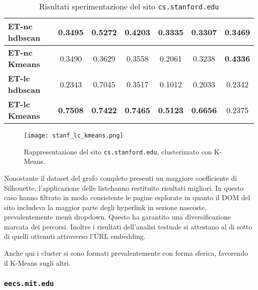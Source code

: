 \begin{table}[H]
\begin{tabular}{| l | c | c | c | c | c | c |}
	\textbf{ET-nc hdbscan} & 0.3495 & 0.5272 & 0.4203 & 0.3335 & 0.3307 & 0.3469\\ [2ex]
	 \hline
	\textbf{ET-nc Kmeans} & 0.3490 & 0.3629 & 0.3558 & 0.2061 & 0.3238 & \textbf{0.4336}\\ [2ex]
	 \hline	
	\textbf{ET-lc hdbscan} & 0.2343 & 0.7045 & 0.3517 & 0.1012 & 0.2033 & 0.2342\\ [2ex]
	\hline
	\textbf{ET-lc Kmeans} & \textbf{0.7508} & \textbf{0.7422} & \textbf{0.7465} & \textbf{0.5123} & \textbf{0.6656} & 0.2375\\ [2ex]
	\hline	
	
	\end{tabular}
	\caption{Risultati sperimentazione del sito \texttt{cs.stanford.edu}}
	\label{metricheStanf}
\end{table}


\begin{figure}[ht!]
	\centering
	\texttt{[image: stanf\_lc\_kmeans.png]}
	\caption{Rappresentazione del sito \texttt{cs.stanford.edu}, clusterizzato con K-Means.}
	\label{lc_embText_km}
\end{figure}

Nonostante il dataset del grafo completo presenti un maggiore coefficiente di Silhouette, l'applicazione delle listehanno restituito risultati migliori. In questo caso hanno filtrato in modo consistente le pagine esplorate in quanto il DOM del sito includeva la maggior parte degli hyperlink in sezione nascoste, prevalentemente menù dropdown. Questo ha garantito una diversificazione marcata dei percorsi. Inoltre i risultati dell'analisi testuale si attestano al di sotto di quelli ottenuti attraverso l'URL embedding. 

Anche qui i cluster si sono formati prevalentemente con forma sferica, favorendo il K-Means sugli altri.

\subsubsection{\texttt{eecs.mit.edu}}

